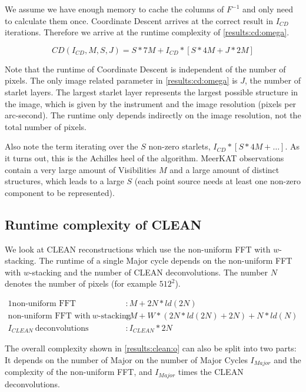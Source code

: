We assume we have enough memory to cache the columns of $F^{-1}$ and only need to calculate them once. Coordinate Descent arrives at the correct result in $I_{CD}$ iterations. Therefore we arrive at the runtime complexity of \eqref{results:cd:omega}.

\begin{equation}\label{results:cd:omega}
CD(I_{CD}, M, S, J) = S*7M + I_{CD} * [S * 4M + J * 2M]
\end{equation}

Note that the runtime of Coordinate Descent is independent of the number of pixels. The only image related parameter in \eqref{results:cd:omega} is $J$, the number of starlet layers. The largest starlet layer represents the largest possible structure in the image, which is given by the instrument and the image resolution (pixels per arc-second). The runtime only depends indirectly on the image resolution, not the total number of pixels.

Also note the term iterating over the $S$ non-zero starlets, $ I_{CD} * [S * 4M +\ldots]$. As it turns out, this is the Achilles heel of the algorithm. MeerKAT observations contain a very large amount of Visibilities $M$ and a large amount of distinct structures, which leads to a large $S$ (each point source needs at least one non-zero component to be represented). 

\subsection{Runtime complexity of CLEAN}
We look at CLEAN reconstructions which use the non-uniform FFT with $w$-stacking. The runtime of a single Major cycle depends on the non-uniform FFT with $w$-stacking and the number of CLEAN deconvolutions. The number $N$ denotes the number of pixels (for example $512^2$).

\begin{alignat*}{1}
	\text{non-uniform FFT} &: M + 2N*ld(2N)\\
	\text{non-uniform FFT with} \:w\text{-stacking} &:M + W*(2N*ld(2N) + 2N) + N*ld(N)\\
	I_{CLEAN}\: \text{deconvolutions} &: I_{CLEAN}*2N
\end{alignat*}

The overall complexity shown in \eqref{results:clean:o} can also be split into two parts: It depends on the number of Major on the number of Major Cycles $I_{Major}$ and the complexity of the non-uniform FFT, and $I_{Major}$ times the CLEAN deconvolutions. 

